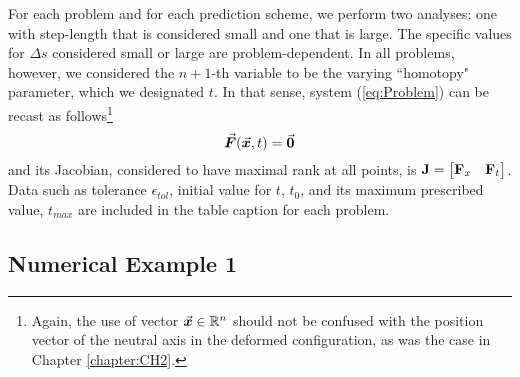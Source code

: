For each problem and for each prediction scheme, we perform two analyses: one
with step-length that is considered small and one that is large. The specific 
values
for $\Delta s$ considered small or large are problem-dependent. In all
problems, however, we considered the $n+1$-th variable to be the varying 
``homotopy"
parameter, which we designated $t$. In that sense, system (\ref{eq:Problem}) 
can be recast as follows\footnote{Again, the use of vector 
$\vec{\bm{x}}\in\mathbb{R}^n$ should not be confused with the position vector of 
the neutral axis in the deformed configuration, as was the case in Chapter 
\ref{chapter:CH2}.}
\begin{equation}
	\vec{\bm{F}}(\vec{\bm{x}},t)=\vec{\bm{0}}
	\label{eq:MProb}
\end{equation}
and its Jacobian, considered to have maximal rank at all points, is $\mathbf{J} =
\begin{bmatrix}
	\mathbf{F}_x & \mathbf{F}_t
\end{bmatrix}
$. Data such as tolerance $\epsilon_{tol}$, initial value for $t$,
$t_0$, and its maximum prescribed value, $t_{max}$ are included in
the table caption for each problem.

\subsection{Numerical Example 1}

